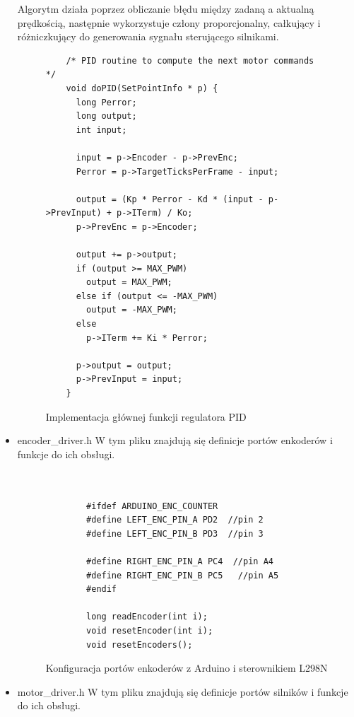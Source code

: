 \documentclass[a4paper,twoside,12pt]{book}
\begin{document}
\begin{itemize}
	Algorytm działa poprzez obliczanie błędu między zadaną a aktualną prędkością, następnie wykorzystuje człony proporcjonalny, całkujący i różniczkujący do generowania sygnału sterującego silnikami.

	\begin{figure}
		\centering
		\begin{lstlisting}
	/* PID routine to compute the next motor commands */
	void doPID(SetPointInfo * p) {
	  long Perror;
	  long output;
	  int input;

	  input = p->Encoder - p->PrevEnc;
	  Perror = p->TargetTicksPerFrame - input;

	  output = (Kp * Perror - Kd * (input - p->PrevInput) + p->ITerm) / Ko;
	  p->PrevEnc = p->Encoder;

	  output += p->output;
	  if (output >= MAX_PWM)
		output = MAX_PWM;
	  else if (output <= -MAX_PWM)
		output = -MAX_PWM;
	  else
		p->ITerm += Ki * Perror;

	  p->output = output;
	  p->PrevInput = input;
	}
		\end{lstlisting}
		\caption{Implementacja głównej funkcji regulatora PID}
		\label{fig:pid-implementation}
	\end{figure}

	\newpage


	\item encoder\_driver.h
	W tym pliku znajdują się definicje portów enkoderów i funkcje do ich obsługi.
	\begin{figure}[!hb]
		\centering
		\begin{lstlisting}
	
	   
		#ifdef ARDUINO_ENC_COUNTER
		#define LEFT_ENC_PIN_A PD2  //pin 2
		#define LEFT_ENC_PIN_B PD3  //pin 3

		#define RIGHT_ENC_PIN_A PC4  //pin A4
		#define RIGHT_ENC_PIN_B PC5   //pin A5
		#endif
		
		long readEncoder(int i);
		void resetEncoder(int i);
		void resetEncoders();

		\end{lstlisting}
		\caption{Konfiguracja portów enkoderów z Arduino i sterownikiem L298N}
		\label{fig:Konfiguracja portów enkoderów}
		\end{figure}
		
		

\newpage
	\item motor\_driver.h
	W tym pliku znajdują się definicje portów silników i funkcje do ich obsługi.
	
	\begin{figure}[!hb]
		\centering
		\begin{lstlisting}


\end{lstlisting}
\end{figure}
\end{itemize}
\end{document}
